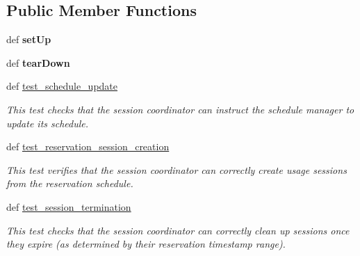\subsection*{Public Member Functions}
\begin{DoxyCompactItemize}
\item 
\hypertarget{classhwm_1_1sessions_1_1tests_1_1test__coordinator_1_1_test_coordinator_ad515ad14dc1a984de607635a81a67455}{def {\bfseries set\-Up}}\label{classhwm_1_1sessions_1_1tests_1_1test__coordinator_1_1_test_coordinator_ad515ad14dc1a984de607635a81a67455}

\item 
\hypertarget{classhwm_1_1sessions_1_1tests_1_1test__coordinator_1_1_test_coordinator_a363d58d2e8912298a07f77b7990e039a}{def {\bfseries tear\-Down}}\label{classhwm_1_1sessions_1_1tests_1_1test__coordinator_1_1_test_coordinator_a363d58d2e8912298a07f77b7990e039a}

\item 
\hypertarget{classhwm_1_1sessions_1_1tests_1_1test__coordinator_1_1_test_coordinator_a3327bf6cf9f23d00fe71d525f409b82f}{def \hyperlink{classhwm_1_1sessions_1_1tests_1_1test__coordinator_1_1_test_coordinator_a3327bf6cf9f23d00fe71d525f409b82f}{test\-\_\-schedule\-\_\-update}}\label{classhwm_1_1sessions_1_1tests_1_1test__coordinator_1_1_test_coordinator_a3327bf6cf9f23d00fe71d525f409b82f}

\begin{DoxyCompactList}\small\item\em This test checks that the session coordinator can instruct the schedule manager to update its schedule. \end{DoxyCompactList}\item 
def \hyperlink{classhwm_1_1sessions_1_1tests_1_1test__coordinator_1_1_test_coordinator_acadee12d9626bb08a67c112eecd94b3c}{test\-\_\-reservation\-\_\-session\-\_\-creation}
\begin{DoxyCompactList}\small\item\em This test verifies that the session coordinator can correctly create usage sessions from the reservation schedule. \end{DoxyCompactList}\item 
\hypertarget{classhwm_1_1sessions_1_1tests_1_1test__coordinator_1_1_test_coordinator_a6ae71c81cbe7ad83b4d1ceca92540af1}{def \hyperlink{classhwm_1_1sessions_1_1tests_1_1test__coordinator_1_1_test_coordinator_a6ae71c81cbe7ad83b4d1ceca92540af1}{test\-\_\-session\-\_\-termination}}\label{classhwm_1_1sessions_1_1tests_1_1test__coordinator_1_1_test_coordinator_a6ae71c81cbe7ad83b4d1ceca92540af1}

\begin{DoxyCompactList}\small\item\em This test checks that the session coordinator can correctly clean up sessions once they expire (as determined by their reservation timestamp range). \end{DoxyCompactList}\end{DoxyCompactItemize}
